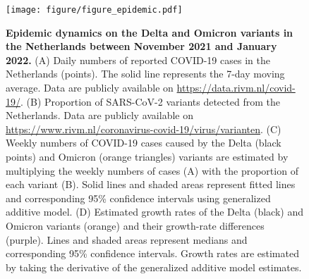 \documentclass[12pt]{article}
\begin{document}
\begin{figure}[!ht]
\texttt{[image: figure/figure\_epidemic.pdf]}
\caption{
\textbf{Epidemic dynamics on the Delta and Omicron variants in the Netherlands between November 2021 and January 2022.}
(A) Daily numbers of reported COVID-19 cases in the Netherlands (points).
The solid line represents the 7-day moving average.
Data are publicly available on \url{https://data.rivm.nl/covid-19/}.
(B) Proportion of SARS-CoV-2 variants detected from the Netherlands. Data are publicly available on \url{https://www.rivm.nl/coronavirus-covid-19/virus/varianten}.
(C) Weekly numbers of COVID-19 cases caused by the Delta (black points) and Omicron (orange triangles) variants are estimated by multiplying the weekly numbers of cases (A) with the proportion of each variant (B).
Solid lines and shaded areas represent fitted lines and corresponding 95\% confidence intervals using generalized additive model.
(D) Estimated growth rates of the Delta (black) and Omicron variants (orange) and their growth-rate differences (purple).
Lines and shaded areas represent medians and corresponding 95\% confidence intervals.
Growth rates are estimated by taking the derivative of the generalized additive model estimates.
\label{fig:epidemic}
}
\end{figure}
\end{document}
